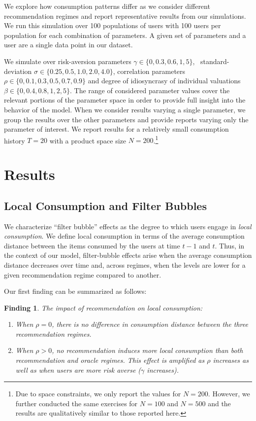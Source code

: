 \documentclass[manuscript]{acmart}
\newtheorem{finding}{Finding}
\begin{document}
We explore how consumption patterns differ as we consider different recommendation regimes and report representative results from our simulations. We run this simulation over 100 populations of users with 100 users per population for each combination of parameters. 
A given set of parameters and a user are a single data point in our dataset.
\par

We simulate over risk-aversion parameters $\gamma \in \{ 0, 0.3, 0.6, 1, 5 \}$, \ standard-deviation $\sigma \in \{ 0.25, 0.5, 1.0, 2.0, 4.0 \}$, correlation parameters $\rho\in \{ 0, 0.1, 0.3, 0.5, 0.7, 0.9 \} $ and degree of idiosyncrasy of individual valuations $\beta \in \{ 0, 0.4, 0.8, 1, 2, 5\}$. The range of considered parameter values cover the relevant portions of the parameter space in order to provide full insight into the behavior of the model. When we consider results varying a single parameter, we group the results over the other parameters and provide reports varying only the parameter of interest. We report results for a relatively small consumption history $T=20$ with a product space size $N=200$.\footnote{Due to space constraints, we only report the values for $N = 200$. However, we further conducted the same exercises for $N = 100$ and $N = 500$ and the results are qualitatively similar to those reported here.}
\section{Results}
\subsection{Local Consumption and Filter Bubbles}
We characterize ``filter bubble'' effects as the degree to which users engage in \textit{local consumption}. We define local consumption in terms of the average consumption distance between the items consumed by the users at time $t-1$ and $t$. Thus, in the context of our model, filter-bubble effects arise when the average consumption distance decreases over time and, across regimes, when the levels are lower for a given recommendation regime compared to another.



Our first finding can be summarized as follows:

\begin{finding}\label{finding_local_consumption}
The impact of recommendation on local consumption:
\begin{enumerate}
\item When $\rho = 0$, there is no difference in consumption distance between the three recommendation regimes.
\item When $\rho > 0$, no recommendation induces more local consumption than both recommendation and oracle regimes. This effect is amplified as $\rho$ increases as well as when users are more risk averse ($\gamma$ increases).
\end{enumerate}
\end{finding}
\end{document}
